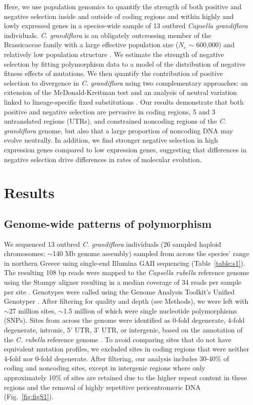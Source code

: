 Here, we use population genomics to quantify the strength of both positive and negative selection inside and outside of coding regions and within highly and lowly expressed genes in a species-wide sample of 13 outbred \textit{Capsella grandiflora} individuals. \textit{C. grandiflora} is an obligately outcrossing member of the Brassicaceae family with a large effective population size ($N_{e}$ $\sim$ 600,000) and relatively low population structure \citep{gossmann2010,St_onge2011-jz}. We estimate the strength of negative selection by fitting polymorphism data to a model of the distribution of negative fitness effects of mutations. We then quantify the contribution of positive selection to divergence in \textit{C. grandiflora} using two complementary approaches: an extension of the McDonald-Kreitman test \citep{Eyre-Walker2009-zt} and an analysis of neutral variation linked to lineage-specific fixed substitutions \citep{sella2009}. Our results demonstrate that both positive and negative selection are pervasive in coding regions, 5\textsc{} and 3\textsc{} untranslated regions (UTRs), and constrained noncoding regions of the \textit{C. grandiflora} genome, but also that a large proportion of noncoding DNA may evolve neutrally. In addition, we find stronger negative selection in high expression genes compared to low expression genes, suggesting that differences in negative selection drive differences in rates of molecular evolution.

\section{Results}
\subsection{Genome-wide patterns of polymorphism}

We sequenced 13 outbred \textit{C. grandiflora} individuals (26 sampled haploid chromosomes; $\sim$140 Mb genome assembly) sampled from across the species' range in northern Greece using single-end Illumina GAII sequencing (Table~\ref{table:s1}). The resulting 108 bp reads were mapped to the \textit{Capsella rubella} reference genome \citep{Slotte2013-py} using the Stampy aligner resulting in a median coverage of 34 reads per sample per site \citep{Lunter2011-uc}. Genotypes were called using the Genome Analysis Toolkit’s Unified Genotyper \citep{gatk}. After filtering for quality and depth (see Methods), we were left with $\sim$27 million sites, $\sim$1.5 million of which were single nucleotide polymorphisms (SNPs). Sites from across the genome were identified as 0-fold degenerate, 4-fold degenerate, intronic, 5’ UTR, 3’ UTR, or intergenic, based on the annotation of the \textit{C. rubella} reference genome \citep{Slotte2013-py}. To avoid comparing sites that do not have equivalent mutation profiles, we excluded sites in coding regions that were neither 4-fold nor 0-fold degenerate. After filtering, our analysis includes 30-40\% of coding and noncoding sites, except in intergenic regions where only approximately 10\% of sites are retained due to the higher repeat content in these regions and the removal of highly repetitive pericentromeric DNA (Fig.~\ref{fig:figS1}). 

